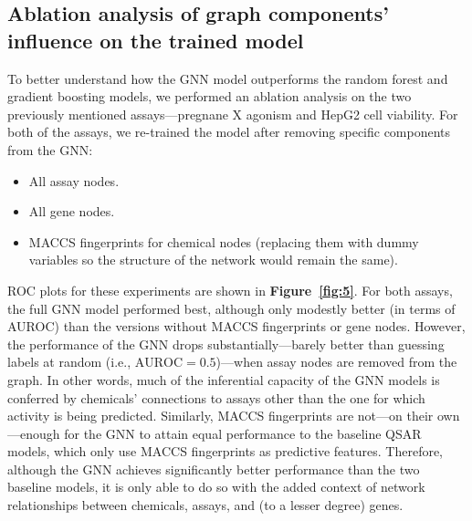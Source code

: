\documentclass{ws-procs11x85}
\begin{document}
\subsection{Ablation analysis of graph components' influence on the trained model}
To better understand how the GNN model outperforms the random forest and gradient boosting models, we performed an ablation analysis on the two previously mentioned assays---pregnane X agonism and HepG2 cell viability.
For both of the assays, we re-trained the model after removing specific components from the GNN:
\begin{itemize}
   \item All assay nodes.
   \item All gene nodes.
   \item MACCS fingerprints for chemical nodes (replacing them with dummy variables so the structure of the network would remain the same).
\end{itemize}
ROC plots for these experiments are shown in \textbf{Figure~\ref{fig:5}}.
For both assays, the full GNN model performed best, although only modestly better (in terms of AUROC) than the versions without MACCS fingerprints or gene nodes.
However, the performance of the GNN drops substantially---barely better than guessing labels at random (i.e., $\textrm{AUROC} = 0.5$)---when assay nodes are removed from the graph.
In other words, much of the inferential capacity of the GNN models is conferred by chemicals' connections to assays other than the one for which activity is being predicted.
Similarly, MACCS fingerprints are not---on their own---enough for the GNN to attain equal performance to the baseline QSAR models, which only use MACCS fingerprints as predictive features.
Therefore, although the GNN achieves significantly better performance than the two baseline models, it is only able to do so with the added context of network relationships between chemicals, assays, and (to a lesser degree) genes.
\end{document}
